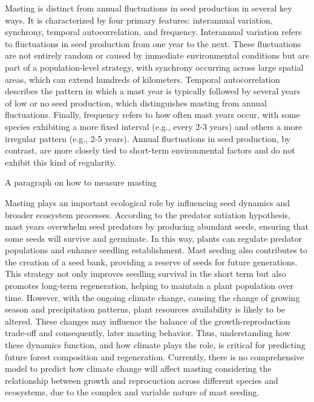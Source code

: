 \documentclass[11pt,letter]{article}
\begin{document}
Masting is distinct from annual fluctuations in seed production in several key ways. It is characterized by four primary features: interannual variation, synchrony, temporal autocorrelation, and frequency. Interannual variation refers to fluctuations in seed production from one year to the next. These fluctuations are not entirely random or caused by immediate environmental conditions but are part of a population-level strategy, with synchrony occurring across large spatial areas, which can extend hundreds of kilometers. Temporal autocorrelation describes the pattern in which a mast year is typically followed by several years of low or no seed production, which distinguishes masting from annual fluctuations. Finally, frequency refers to how often mast years occur, with some species exhibiting a more fixed interval (e.g., every 2-3 years) and others a more irregular pattern (e.g., 2-5 years). Annual fluctuations in seed production, by contrast, are more closely tied to short-term environmental factors and do not exhibit this kind of regularity. \par
A paragraph on how to measure masting\par
Masting plays an important ecological role by influencing seed dynamics and broader ecosystem processes. According to the predator satiation hypothesis, mast years overwhelm seed predators by producing abundant seeds, ensuring that some seeds will survive and germinate. In this way, plants can regulate predator populations and enhance seedling establishment. Mast seeding also contributes to the creation of a seed bank, providing a reserve of seeds for future generations. This strategy not only improves seedling survival in the short term but also promotes long-term regeneration, helping to maintain a plant population over time.
However, with the ongoing climate change, causing the change of growing season and precipitation patterns, plant resources availability is likely to be altered. These changes may influence the balance of the growth-reproduction trade-off and consequently, later masting behavior. Thus, understanding how these dynamics function, and how climate plays the role, is critical for predicting future forest composition and regeneration. Currently, there is no comprehensive model to predict how climate change will affect masting considering the relationship between growth and reprocuction across different species and ecosystems, due to the complex and variable nature of mast seeding.\par
\end{document}
